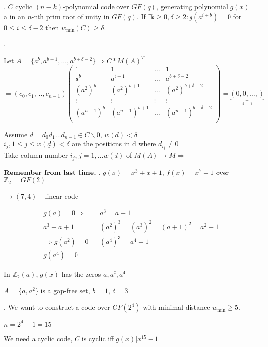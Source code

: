 \Theorem.
$C$ cyclic $(n-k)$-polynomial code over $GF(q)$, generating polynomial $g(x)$ a in an $n$-nth prim root of unity in $GF(q)$. If $\exists b \geq 0, \delta \geq 2: g(a^{i+b}) = 0$ for $0 \leq i \leq \delta -2$ then $w_{\min}(C) \geq \delta$.

\Proof.

Let $A = \{a^b , a^{b+1}, \ldots, a^{b+\delta-2}\} \Rightarrow C * M(A)^T$\\
$= (c_0, c_1, \ldots, c_{n-1}) \begin{pmatrix}
  1 & 1& \ldots & 1\\
  a^{b} & a^{b+1} & \ldots & a^{b+\delta-2} \\
  (a^{2})^{b} & (a^{2})^{b+1} & \ldots & (a^{2})^{b+\delta-2} \\
  \vdots  & \vdots & \vdots & \vdots \\
  (a^{n-1})^{b} & (a^{n-1})^{b+1} & \ldots & (a^{n-1})^{b+\delta-2} \\
\end{pmatrix} = \underbrace{(0,0,\ldots, )}_{\delta-1}$

Assume $\underline{d} = d_0 d_1 \ldots d_{n-1} \in C \backslash{0}$, $w(d) < \delta$\\
$i_j, 1 \leq j \leq w(\underline{d}) < \delta$ are the positions in d where $d_{i_j} \neq 0$ \\
Take column number $i_j$, $j= 1, \ldots w(\underline{d})$ of $M(A) \to M \Rightarrow$


\textbf{Remember from last time.}
\Example.
$g(x) = x^3 +x+1$, $f(x) = x^7-1$ over $\mathbb{Z}_2 = GF(2)$

$\to (7,4)-$linear code

\begin{align*}
  &g(a) = 0 \Rightarrow && a^3= a+1\\
  &a^3+a+1              &&(a^2)^3 = (a^3)^2 = (a+1)^2 = a^2+1\\
  &\Rightarrow g(a^2) = 0  && (a^4)^3 = a^4+1\\
  &g(a^4)=0
\end{align*}

In $\mathbb{Z}_2(a)$, $g(x)$ has the zeros $a,a^2,a^4$

$A = \{a,a^2\}$ is a gap-free set, $b=1$, $\delta =3$

\Example.
We want to construct a code over $GF(2^4)$ with minimal distance $w_{\min} \geq 5$.

$n=2^4-1=15$

We need a cyclic code, $C$ is cyclic iff $g(x)|x^{15}-1$

